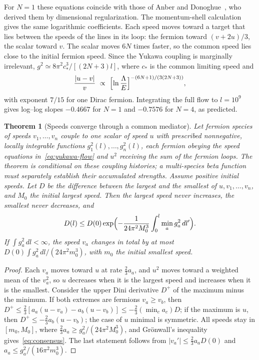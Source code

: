 \documentclass[12pt]{article}
\newtheorem{theorem}{Theorem}
\theoremstyle{definition}
\theoremstyle{remark}
\begin{document}
For $N=1$ these equations coincide with those of Anber and Donoghue~\cite{AnberDonoghue2011}, who derived them by dimensional regularization. The momentum-shell calculation gives the same logarithmic coefficients. Each speed moves toward a target that lies between the speeds of the lines in its loop: the fermion toward $(v+2u)/3$, the scalar toward $v$. The scalar moves $6N$ times faster, so the common speed lies close to the initial fermion speed. Since the Yukawa coupling is marginally irrelevant, $g^2\simeq8\pi^2c_*^3/[(2N+3)l]$, where $c_*$ is the common limiting speed and
\begin{equation}
\frac{|u-v|}{v}\ \propto\ \Bigl[\ln\frac{\Lambda}{E}\Bigr]^{-(6N+1)/(3(2N+3))},
\label{eq:log-rate}
\end{equation}
with exponent $7/15$ for one Dirac fermion. Integrating the full flow to $l=10^9$ gives log--log slopes $-0.4667$ for $N=1$ and $-0.7576$ for $N=4$, as predicted.

\begin{theorem}[Speeds converge through a common mediator]
\label{thm:consensus}
Let fermion species of speeds $v_1,\dots,v_n$ couple to one scalar of speed $u$ with prescribed nonnegative, locally integrable functions $g_1^2(l),\dots,g_n^2(l)$, each fermion obeying the speed equations in~\eqref{eq:yukawa-flow} and $u^2$ receiving the sum of the fermion loops. The theorem is conditional on these coupling histories; a multi-species beta function must separately establish their accumulated strengths. Assume positive initial speeds. Let $D$ be the difference between the largest and the smallest of $u,v_1,\dots,v_n$, and $M_0$ the initial largest speed. Then the largest speed never increases, the smallest never decreases, and
\begin{equation}
D(l)\le D(0)\exp\Bigl(-\frac{1}{24\pi^2M_0^3}\int_0^l\min_ag_a^2\,dl'\Bigr).
\label{eq:consensus}
\end{equation}
If $\int g_a^2\,dl<\infty$, the speed $v_a$ changes in total by at most $D(0)\int g_a^2\,dl/(24\pi^2m_0^3)$, with $m_0$ the initial smallest speed.
\end{theorem}

\begin{proof}
Each $v_a$ moves toward $u$ at rate $\frac23a_a$, and $u^2$ moves toward a weighted mean of the $v_a^2$, so $u$ decreases when it is the largest speed and increases when it is the smallest. Consider the upper Dini derivative $D^+$ of the maximum minus the minimum. If both extremes are fermions $v_a\ge v_b$, then $D^+\le\frac23[a_a(u-v_a)-a_b(u-v_b)]\le-\frac23(\min_ca_c)D$; if the maximum is $u$, then $D^+\le-\frac23a_b(u-v_b)$; the case of $u$ minimal is symmetric. All speeds stay in $[m_0,M_0]$, where $\frac23a_a\ge g_a^2/(24\pi^2M_0^3)$, and Gr\"onwall's inequality gives~\eqref{eq:consensus}. The last statement follows from $|v_a'|\le\frac23a_aD(0)$ and $a_a\le g_a^2/(16\pi^2m_0^3)$.
\end{proof}
\end{document}

